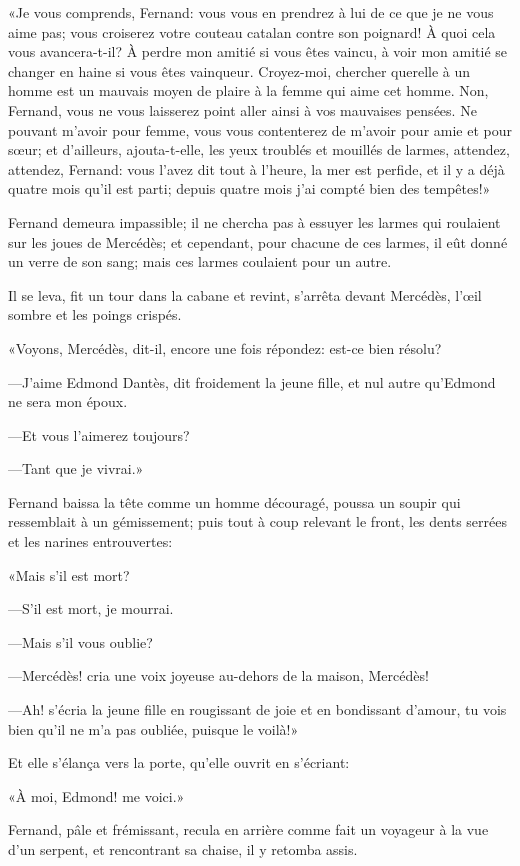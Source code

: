 «Je vous comprends, Fernand: vous vous en prendrez à lui de ce que je ne vous aime pas; vous croiserez votre couteau catalan contre son poignard! À quoi cela vous avancera-t-il? À perdre mon amitié si vous êtes vaincu, à voir mon amitié se changer en haine si vous êtes vainqueur. Croyez-moi, chercher querelle à un homme est un mauvais moyen de plaire à la femme qui aime cet homme. Non, Fernand, vous ne vous laisserez point aller ainsi à vos mauvaises pensées. Ne pouvant m'avoir pour femme, vous vous contenterez de m'avoir pour amie et pour sœur; et d'ailleurs, ajouta-t-elle, les yeux troublés et mouillés de larmes, attendez, attendez, Fernand: vous l'avez dit tout à l'heure, la mer est perfide, et il y a déjà quatre mois qu'il est parti; depuis quatre mois j'ai compté bien des tempêtes!»

Fernand demeura impassible; il ne chercha pas à essuyer les larmes qui roulaient sur les joues de Mercédès; et cependant, pour chacune de ces larmes, il eût donné un verre de son sang; mais ces larmes coulaient pour un autre.

Il se leva, fit un tour dans la cabane et revint, s'arrêta devant Mercédès, l'œil sombre et les poings crispés.

«Voyons, Mercédès, dit-il, encore une fois répondez: est-ce bien résolu?

—J'aime Edmond Dantès, dit froidement la jeune fille, et nul autre qu'Edmond ne sera mon époux.

—Et vous l'aimerez toujours?

—Tant que je vivrai.»

Fernand baissa la tête comme un homme découragé, poussa un soupir qui ressemblait à un gémissement; puis tout à coup relevant le front, les dents serrées et les narines entrouvertes:

«Mais s'il est mort?

—S'il est mort, je mourrai.

—Mais s'il vous oublie?

—Mercédès! cria une voix joyeuse au-dehors de la maison, Mercédès!

—Ah! s'écria la jeune fille en rougissant de joie et en bondissant d'amour, tu vois bien qu'il ne m'a pas oubliée, puisque le voilà!»

Et elle s'élança vers la porte, qu'elle ouvrit en s'écriant:

«À moi, Edmond! me voici.»

Fernand, pâle et frémissant, recula en arrière comme fait un voyageur à la vue d'un serpent, et rencontrant sa chaise, il y retomba assis.

